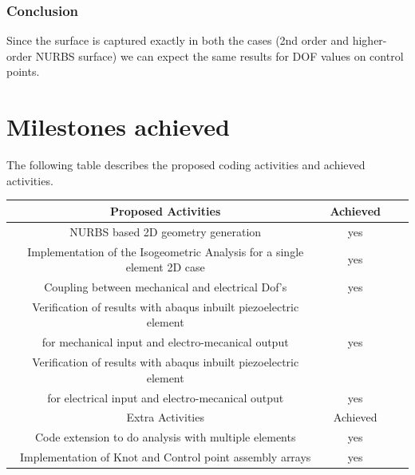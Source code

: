\documentclass[11pt]{article}
\begin{document}
\subsubsection{Conclusion}
Since the surface is captured exactly in both the cases (2nd order and higher-order NURBS surface) we can expect the same results for DOF values on control points.  




 



\newpage
\section{Milestones achieved}
The following table describes the proposed coding activities and achieved activities.
\begin{center}
	\begin{tabular}{ |c|c|c|c| } 
		\hline
		Proposed Activities & Achieved \\
		\hline 
		NURBS based 2D geometry generation & yes \\
		Implementation of the Isogeometric Analysis for a single element 2D case & yes \\  
		Coupling between mechanical and electrical Dof’s & yes \\ 
		Verification of results with abaqus inbuilt piezoelectric element & \\
		for mechanical input and electro-mecanical output & yes \\ 
		Verification of results with abaqus inbuilt piezoelectric element & \\
		for electrical input and electro-mecanical output & yes \\ 
		\hline
		Extra Activities & Achieved \\
		\hline
		Code extension to do analysis with multiple elements & yes \\
		Implementation of Knot and Control point assembly arrays & yes \\
		\hline
	\end{tabular}
\end{center}
\end{document}
